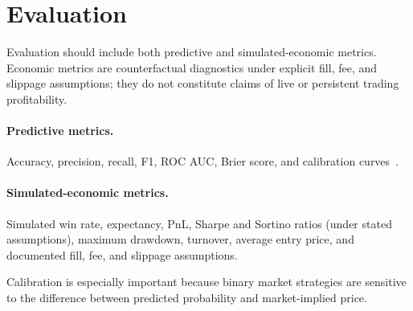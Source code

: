 \section{Evaluation}
\label{sec:evaluation}

Evaluation should include both predictive and simulated-economic metrics.
Economic metrics are counterfactual diagnostics under explicit fill, fee, and
slippage assumptions; they do not constitute claims of live or persistent
trading profitability.

\paragraph{Predictive metrics.}
Accuracy, precision, recall, F1, ROC AUC, Brier score, and calibration
curves~\cite{brier1950verification}.

\paragraph{Simulated-economic metrics.}
Simulated win rate, expectancy, PnL, Sharpe and Sortino ratios (under stated
assumptions), maximum drawdown, turnover, average entry price, and documented
fill, fee, and slippage assumptions.

Calibration is especially important because binary market strategies are
sensitive to the difference between predicted probability and market-implied
price.